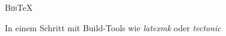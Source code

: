 \documentclass[aspectratio=169]{beamer}
\newenvironment{Shaded}{\begin{snugshade}}{\end{snugshade}}
\newcommand{\NormalTok}[1]{\textcolor[rgb]{0.19,0.19,0.19}{#1}}
\newenvironment{Shaded}{}{}
\newcommand\citestyle[1]{\textcolor{foreground-secondary}{\textsuperscript{#1}}}
\let\oldcite=\cite
\renewcommand{\cite}[1]{\citestyle{\oldcite{#1}}}
\begin{document}
\begin{frame}[fragile]{\textsc{Bib}\TeX}
    \vspace{0.2\baselineskip}

    \begin{minipage}{0.495\textwidth}

\begin{Shaded}
\end{Shaded}

    \end{minipage}\begin{minipage}{0.01\textwidth}

    \phantom{x}

    \end{minipage}\begin{minipage}{0.495\textwidth}

    \begin{flushleft}
    In einem Schritt mit Build-Tools wie \mbox{\emph{latexmk}}\cite{ctan-latexmk} oder \mbox{\emph{tectonic}}\cite{tectonic}
    \end{flushleft}

    \end{minipage}
    \end{frame}
\end{document}
